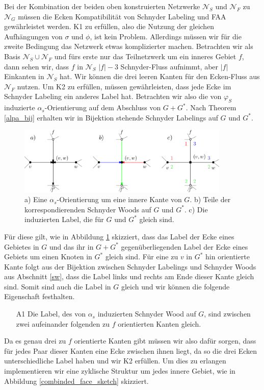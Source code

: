 Bei der Kombination der beiden oben konstruierten Netzwerke $\mathcal{N}_S$ und $\mathcal{N}_F$ zu $\mathcal{N}_G$ müssen die Ecken Kompatibilität von Schnyder Labeling und FAA gewährleistet werden. K1 zu erfüllen, also die Nutzung der gleichen Aufhängungen von $\sigma$ und $\phi$, ist kein Problem. Allerdings müssen wir für die zweite Bedingung das Netzwerk etwas komplizierter machen. Betrachten wir als Basis $\mathcal{N}_S \cup \mathcal{N}_F$ und fürs erste nur das Teilnetzwerk um ein inneres Gebiet $f$, dann sehen wir, dass $f$ in $\mathcal{N}_S$ $|f|-3$ Schnyder-Fluss aufnimmt, aber $|f|$ Einkanten in $\mathcal{N}_S$ hat. Wir können die drei leeren Kanten für den Ecken-Fluss aus $\mathcal{N}_F$ nutzen. Um K2 zu erfüllen, müssen gewährleisten, dass jede Ecke im Schnyder Labeling ein anderes Label hat. Betrachten wir also die von $\varphi_S$ induzierte $\alpha_s$-Orientierung auf dem Abschluss von $G+G^*$. Nach Theorem \ref{alpa_bij} erhalten wir in Bijektion stehende Schnyder Labelings auf $G$ und $G^*$.

\begin{figure}[h]
	\centering
  	\includegraphics[width=0.9\textwidth]{alpha_bij.png}
  	\caption{a) Eine $\alpha_s$-Orientierung um eine innere Kante von $G$. b) Teile der korrespondierenden Schnyder Woods auf $G$ und $G^*$. c) Die induzierten Label, die für $G$ und $G^*$ gleich sind.}
	\label{alpha_bij}
\end{figure}

Für diese gilt, wie in Abbildung \ref{alpha_bij} skizziert, dass das Label der Ecke eines Gebietes in $G$ und das ihr in $G+G^*$ gegenüberliegenden Label der Ecke eines Gebiets um einen Knoten in $G^*$ gleich sind. Für eine zu $v$ in $G^*$ hin orientierte Kante folgt aus der Bijektion zwischen Schnyder Labelings und Schnyder Woods aus Abschnitt \ref{sw}, dass die Label links und rechts am Ende dieser Kante gleich sind. Somit sind auch die Label in $G$ gleich und wir können die folgende Eigenschaft festhalten.
\begin{itemize}
\item [A1] Die Label, des von $\alpha_s$ induzierten Schnyder Wood auf $G$, sind zwischen zwei aufeinander folgenden zu $f$ orientierten Kanten gleich.
\end{itemize}
Da es genau drei zu $f$ orientierte Kanten gibt müssen wir also dafür sorgen, dass für jedes Paar dieser Kanten eine Ecke zwischen ihnen liegt, da so die drei Ecken unterschiedliche Label haben und wir K2 erfüllen. Um dies zu erlangen implementieren wir eine zyklische Struktur um jedes innere Gebiet, wie in Abbildung \ref{combinded_face_sketch} skizziert.\\

